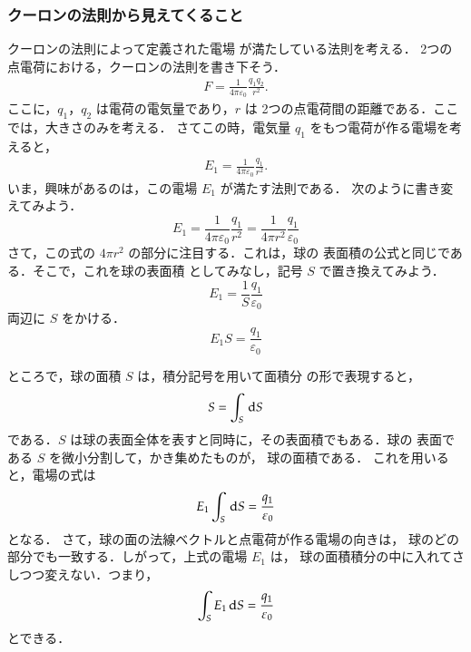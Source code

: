         \subsubsection{クーロンの法則から見えてくること}
            クーロンの法則によって定義された電場 が満たしている法則を考える．
            2つの点電荷における，クーロンの法則を書き下そう．
                \begin{align}
                    F  =  \frac{1}{4\pi \varepsilon_{0} } \frac{q_{1}q_{2}}{r^{2}}.
                \end{align}
            ここに，$q_{1}$，$q_{2}$ は電荷の電気量であり，$r$ は
            2つの点電荷間の距離である．ここでは，大きさのみを考える．
            さてこの時，電気量 $q_{1}$ をもつ電荷が作る電場を考えると，
                \begin{align}
                    E_{1}  =  \frac{1}{4\pi \varepsilon_{0}} \frac{q_{1}}{r^{2}}.
                \end{align}
            いま，興味があるのは，この電場 $E_{1}$ が満たす法則である．
            次のように書き変えてみよう．
                \begin{equation*}
                    E_{1}  =  \frac{1}{4\pi \varepsilon_{0}} \frac{q_{1}}{r^{2}}
                            =  \frac{1}{4\pi r^{2}} \frac{q_{1}}{\varepsilon_{0}}
                \end{equation*}
            さて，この式の $4\pi r^{2}$ の部分に注目する．これは，球の
            表面積の公式と同じである．そこで，これを球の表面積
            としてみなし，記号 $S$ で置き換えてみよう．
                \begin{equation*}
                    E_{1}  =  \frac{1}{S} \frac{q_{1}}{\varepsilon_{0}}
                \end{equation*}
            両辺に $S$ をかける．
                \begin{equation*}
                    E_{1}S  =   \frac{q_{1}}{\varepsilon_{0}}
                \end{equation*}

            ところで，球の面積 $S$ は，積分記号を用いて面積分
            の形で表現すると，
                \begin{equation*}
                    S = \int_{S} \,\mathrm{d} S
                \end{equation*}
            である．$S$ は球の表面全体を表すと同時に，その表面積でもある．球の
            表面である $S$ を微小分割して，かき集めたものが，
            球の面積である．
            これを用いると，電場の式は
                \begin{equation*}
                    E_{1}\int_{S} \,\mathrm{d} S  =   \frac{q_{1}}{\varepsilon_{0}}
                \end{equation*}
            となる．
            さて，球の面の法線ベクトルと点電荷が作る電場の向きは，
            球のどの部分でも一致する．しがって，上式の電場 $E_{1}$ は，
            球の面積積分の中に入れてさしつつ変えない．つまり，
                \begin{equation*}
                    \int_{S} E_{1}\,\mathrm{d} S  =   \frac{q_{1}}{\varepsilon_{0}}
                \end{equation*}
            とできる．

